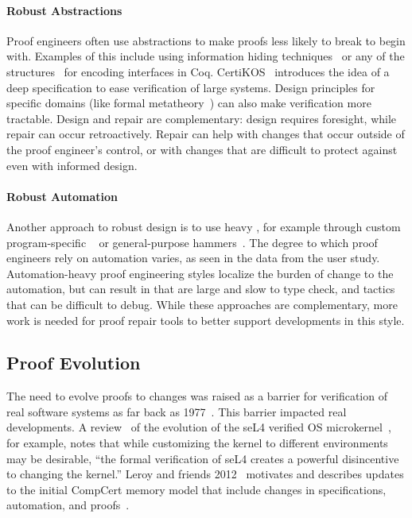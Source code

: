 \paragraph{Robust Abstractions}
Proof engineers often use abstractions to make proofs less likely to break to begin with.
Examples of this include using 
information hiding techniques~\cite{Woos:2016:PCF:2854065.2854081, Klein2014}
or any of the structures~\cite{Chrzaszcz2004, Sozeau2008, Saibi:PhD} for encoding interfaces in Coq.
CertiKOS~\cite{certikos} introduces the idea of a deep specification to ease verification of large systems.
Design principles for specific domains (like formal metatheory~\cite{Aydemir2008, Delaware2013POPL, Delaware2013ICFP})
can also make verification more tractable.
Design and repair are complementary: design requires foresight, while repair can occur retroactively.
Repair can help with changes that occur outside of the proof engineer's control,
or with changes that are difficult to protect against even with informed design.

\paragraph{Robust Automation}
Another approach to robust design is to use heavy , for example through
custom program-specific ~\cite{chlipala:cpdt}
or general-purpose hammers~\cite{Blanchette2016b, Blanchette2013, Kaliszyk2014, Czajka2018}.
The degree to which proof engineers rely on automation varies, as seen in the data from the  user study.
Automation-heavy proof engineering styles localize the burden of change to the automation,
but can result in  that are large and slow to type check,
and tactics that can be difficult to debug.
While these approaches are complementary, more work is needed for proof repair tools to better support 
developments in this style.

\subsection{Proof Evolution}
\label{sec:refrep}


The need to evolve proofs to changes was raised as a barrier for verification of real software systems as far back as 1977~\cite{DeMillo1977}.
This barrier impacted real developments.
A review~\cite{Elphinstone2013} of the evolution of the seL4 verified 
OS microkernel~\cite{Klein2009}, for example, notes that while
customizing the kernel to different environments may be desirable, 
``the formal verification of seL4 creates a powerful disincentive to changing the kernel.''
Leroy and friends 2012~\cite{leroy2012} motivates and describes updates to the initial CompCert memory model
that include changes in specifications, automation, and proofs~\cite{leroy-mem-2010}.

